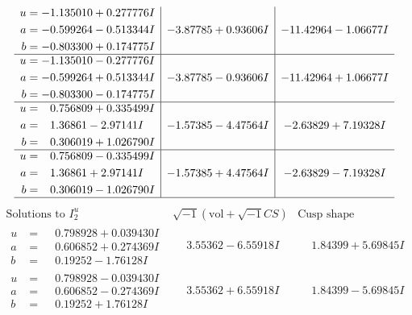 \documentclass[1p]{elsarticle_modified}
\theoremstyle{definition}
\newcommand{\I}{\sqrt{-1}}
\begin{document}
$$\begin{array}{c|c|c}
\begin{aligned}
u &= -1.135010 + 0.277776 I \\
a &= -0.599264 - 0.513344 I \\
b &= -0.803300 + 0.174775 I\end{aligned}
 & -3.87785 + 0.93606 I & -11.42964 - 1.06677 I \\ \hline\begin{aligned}
u &= -1.135010 - 0.277776 I \\
a &= -0.599264 + 0.513344 I \\
b &= -0.803300 - 0.174775 I\end{aligned}
 & -3.87785 - 0.93606 I & -11.42964 + 1.06677 I \\ \hline\begin{aligned}
u &= \phantom{-}0.756809 + 0.335499 I \\
a &= \phantom{-}1.36861 - 2.97141 I \\
b &= \phantom{-}0.306019 + 1.026790 I\end{aligned}
 & -1.57385 - 4.47564 I & -2.63829 + 7.19328 I \\ \hline\begin{aligned}
u &= \phantom{-}0.756809 - 0.335499 I \\
a &= \phantom{-}1.36861 + 2.97141 I \\
b &= \phantom{-}0.306019 - 1.026790 I\end{aligned}
 & -1.57385 + 4.47564 I & -2.63829 - 7.19328 I\\
 \hline 
 \end{array}$$\newpage$$\begin{array}{c|c|c}  
\text{Solutions to }I^u_{2}& \I (\text{vol} + \sqrt{-1}CS) & \text{Cusp shape}\\
 \hline 
\begin{aligned}
u &= \phantom{-}0.798928 + 0.039430 I \\
a &= \phantom{-}0.606852 + 0.274369 I \\
b &= \phantom{-}0.19252 - 1.76128 I\end{aligned}
 & \phantom{-}3.55362 - 6.55918 I & \phantom{-}1.84399 + 5.69845 I \\ \hline\begin{aligned}
u &= \phantom{-}0.798928 - 0.039430 I \\
a &= \phantom{-}0.606852 - 0.274369 I \\
b &= \phantom{-}0.19252 + 1.76128 I\end{aligned}
 & \phantom{-}3.55362 + 6.55918 I & \phantom{-}1.84399 - 5.69845 I \\ \hline\begin{aligned}

\end{aligned}
\end{array}$$
\end{document}
